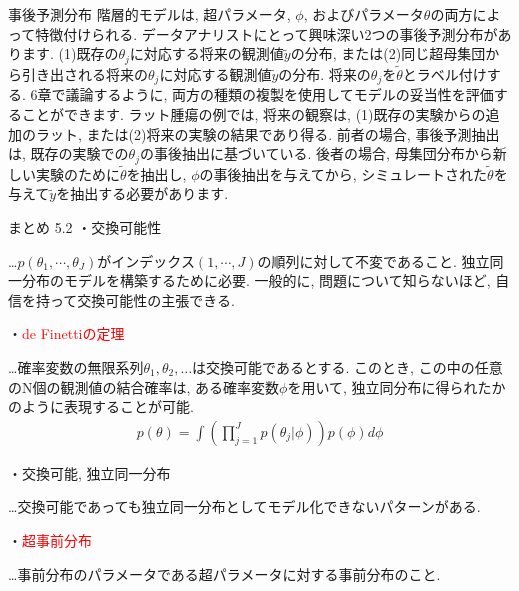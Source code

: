 \documentclass[10pt,dvipdfmx,a4]{beamer}
\newcommand{\eqn}[1]{\begin{align*}#1\end{align*}}
\newcommand{\tcr}[1]{\textcolor{red}{#1}}
\begin{document}

\begin{frame}{事後予測分布}
階層的モデルは, 超パラメータ, $\phi$, およびパラメータ$\theta$の両方によって特徴付けられる.
データアナリストにとって興味深い2つの事後予測分布があります.
(1)既存の$\theta_j$に対応する将来の観測値$\tilde{y}$の分布, または(2)同じ超母集団から引き出される将来の$\theta_j$に対応する観測値$\tilde{y}$の分布.
将来の$\theta_j$を$\tilde{\theta}$とラベル付けする.
6章で議論するように, 両方の種類の複製を使用してモデルの妥当性を評価することができます.
ラット腫瘍の例では, 将来の観察は, (1)既存の実験からの追加のラット, または(2)将来の実験の結果であり得る.
前者の場合, 事後予測抽出は, 既存の実験での$\theta_j$の事後抽出に基づいている.
後者の場合, 母集団分布から新しい実験のために$\tilde{\theta}$を抽出し, $\phi$の事後抽出を与えてから, シミュレートされた$\tilde{\theta}$を与えて$\tilde{y}$を抽出する必要があります.
\end{frame}


\begin{frame}{まとめ 5.2}
・交換可能性

…$p(\theta_1,\cdots,\theta_J)$がインデックス$(1,\cdots,J)$の順列に対して不変であること.
独立同一分布のモデルを構築するために必要.
一般的に, 問題について知らないほど, 自信を持って交換可能性の主張できる.

・\tcr{de Finettiの定理}

…確率変数の無限系列$\theta_1,\theta_2,\dots$は交換可能であるとする.
このとき, この中の任意のN個の観測値の結合確率は, ある確率変数$\phi$を用いて, 独立同分布に得られたかのように表現することが可能.
\eqn{p(\theta)=\int \left(\prod_{j=1}^Jp(\theta_j|\phi)\right)p(\phi)d\phi}

・交換可能, 独立同一分布

…交換可能であっても独立同一分布としてモデル化できないパターンがある.

・\tcr{超事前分布}

…事前分布のパラメータである超パラメータに対する事前分布のこと.
\end{frame}

\end{document}
